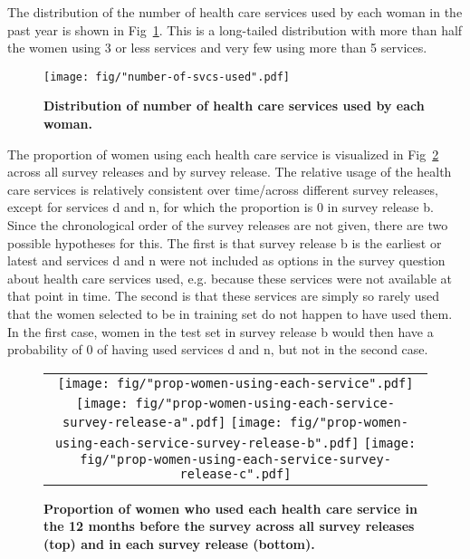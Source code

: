 \documentclass{article}\usepackage[]{graphicx}\usepackage[]{color}
\begin{document}
The distribution of the number of health care services used by each woman in the past year is shown in Fig~\ref{fig-num-svcs}. This is a long-tailed distribution with more than half the women using 3 or less services and very few using more than 5 services.

\begin{figure}[htbp]
\begin{center}
\texttt{[image: fig/"number-of-svcs-used".pdf]}
\caption{\textbf{Distribution of number of health care services used by each woman.}}
\label{fig-num-svcs}
\end{center}
\end{figure}

The proportion of women using each health care service is visualized in Fig~\ref{fig-prop-svcs} across all survey releases and by survey release. The relative usage of the health care services is relatively consistent over time/across different survey releases, except for services d and n, for which the proportion is 0 in survey release b. Since the chronological order of the survey releases are not given, there are two possible hypotheses for this. The first is that survey release b is the earliest or latest and services d and n were not included as options in the survey question about health care services used, e.g. because these services were not available at that point in time. The second is that these services are simply so rarely used that the women selected to be in training set do not happen to have used them. In the first case, women in the test set in survey release b would then have a probability of 0 of having used services d and n, but not in the second case.

\begin{figure}[htbp]
\begin{center}
\begin{tabular}{c}
\texttt{[image: fig/"prop-women-using-each-service".pdf]} \\
\texttt{[image: fig/"prop-women-using-each-service-survey-release-a".pdf]}
\texttt{[image: fig/"prop-women-using-each-service-survey-release-b".pdf]}
\texttt{[image: fig/"prop-women-using-each-service-survey-release-c".pdf]}
\end{tabular}
\caption{\textbf{Proportion of women who used each health care service in the 12 months before the survey across all survey releases (top) and in each survey release (bottom).}}
\label{fig-prop-svcs}
\end{center}
\end{figure}
\end{document}
